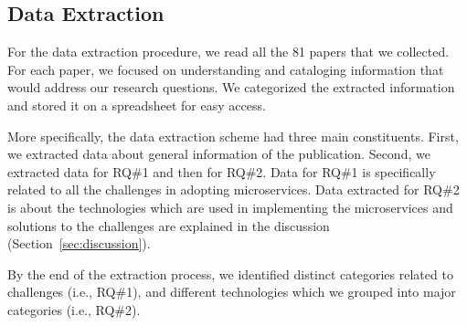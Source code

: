 \subsection{Data Extraction}


For the data extraction procedure, we read all the 81 papers that we collected. For each paper, we focused on understanding and cataloging information that would address our research questions. We categorized the extracted information and stored it on a spreadsheet for easy access. 

More specifically, the data extraction scheme had three main constituents. First, we extracted data about general information of the publication. Second, we extracted data for RQ\#1 and then for RQ\#2. Data for RQ\#1 is specifically related to all the challenges in adopting microservices. Data extracted for RQ\#2 is about the technologies which are used in implementing the microservices and solutions to the challenges are explained in the discussion (Section~\ref{sec:discussion}).

By the end of the extraction process, we identified \challengecount distinct categories related to challenges (i.e., RQ\#1), and \techcount different technologies which we grouped into \techgroupcount major categories (i.e., RQ\#2). 


